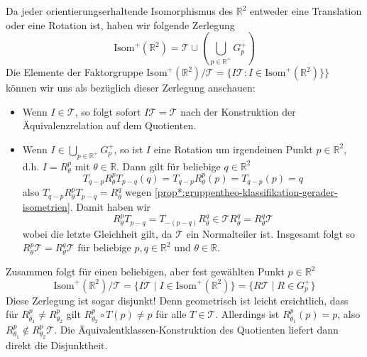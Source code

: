 \documentclass[a4paper, ngerman]{article}
\numberwithin{equation}{chapter}
\theoremstyle{plain}
\theoremstyle{definition}
\newcommand{\geradisometr}{\ensuremath{\mathrm{Isom}^+(\mathbb R^2)}}
\newcommand{\anm}[1]{{\color{red} #1}}
\begin{document}
Da jeder orientierungserhaltende Isomorphismus des \(\mathbb R^2\) entweder eine Translation oder eine Rotation ist, haben wir folgende Zerlegung
\begin{equation*}
    \geradisometr = \mathcal T \cup \left(\textstyle \bigcup_{p \in \mathbb R^+} G_p^+\right)
\end{equation*}
Die Elemente der Faktorgruppe \(\geradisometr/\mathcal T = \{I\mathcal{T} : I \in \geradisometr\}\}\) können wir uns als bezüglich dieser Zerlegung anschauen:
\begin{itemize}
    \item Wenn \(I \in \mathcal T\), so folgt sofort \(I\mathcal T = \mathcal T\) nach der Konstruktion der Äquivalenzrelation auf dem Quotienten. 
    \item Wenn \(I \in \bigcup_{p \in \mathbb R^+} G_p^+\), so ist \(I\) eine Rotation um irgendeinen Punkt \(p\in \mathbb R^2\), d.h. \(I = R_\theta^p\) mit \(\theta \in \mathbb R\). Dann gilt für beliebige \(q \in \mathbb R^2\)
    \begin{equation*}
        T_{q-p} R_\theta^p T_{p-q}(q) = T_{q-p} R_\theta^p(p) = T_{q-p}(p) = q
    \end{equation*}
    also \(T_{q-p} R_\theta^p T_{p-q} = R_\theta^q\) wegen \cref{prop*:gruppentheo-klassifikation-gerader-isometrien}. Damit haben wir 
    \begin{equation*}
        R_\theta^p T_{p-q} = T_{-(p-q)}R_\theta^q \in \mathcal T R_\theta^q = R_\theta^q \mathcal T 
    \end{equation*}
    wobei die letzte Gleichheit gilt, da \(\mathcal T\) ein Normalteiler ist. Insgesamt folgt so \(R_\theta^p \mathcal T = R_\theta^q \mathcal T\) für beliebige \(p,q \in \mathbb R^2\) und \(\theta\in \mathbb R\). 
\end{itemize} 
Zusammen folgt für einen beliebigen, aber fest gewählten Punkt \(p \in \mathbb R^2\)
\begin{equation*}
    \geradisometr/\mathcal T = \{I\mathcal{T} \mid I \in \geradisometr\} = \{R\mathcal{T} \mid R \in G_p^+\}
\end{equation*}
Diese Zerlegung ist sogar disjunkt! Denn geometrisch ist leicht ersichtlich, dass für \(R_{\theta_1}^p \neq R_{\theta_2}^p\) gilt \(R_{\theta_2}^p\circ T(p) \neq p\) für alle \(T \in \mathcal T\). Allerdings ist \(R_{\theta_1}^p(p) = p\), also \(R_{\theta_1}^p\notin R_{\theta_2}^p \mathcal T\). Die Äquivalentklassen-Konstruktion des Quotienten liefert dann direkt die Disjunktheit. 
\end{document}
